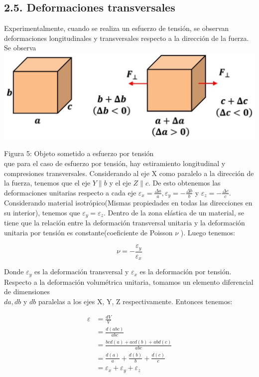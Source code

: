 \documentclass[10pt]{article}
\begin{document}
\subsection*{2.5. Deformaciones transversales}
Experimentalmente, cuando se realiza un esfuerzo de tensión, se observan deformaciones longitudinales y transversales respecto a la dirección de la fuerza. Se observa\\
\includegraphics[max width=\textwidth, center]{2025_04_28_a9941da8947ada55c6c9g-06}

Figura 5: Objeto sometido a esfuerzo por tensión\\
que para el caso de esfuerzo por tensión, hay estiramiento longitudinal y compresiones transversales. Considerando al eje X como paralelo a la dirección de la fuerza, tenemos que el eje $Y \| b$ y el eje $Z \| c$. De esto obtenemos las deformaciones unitarias respecto a cada eje $\varepsilon_{x}=\frac{\Delta a}{a}, \varepsilon_{y}=-\frac{\Delta b}{b}$ y $\varepsilon_{z}=-\frac{\Delta c}{c}$. Considerando material isotrópico(Mismas propiedades en todas las direcciones en su interior), tenemos que $\varepsilon_{y}=\varepsilon_{z}$. Dentro de la zona elástica de un material, se tiene que la relación entre la deformación transversal unitaria y la deformación unitaria por tensión es constante(coeficiente de Poisson $\nu$ ). Luego tenemos:


\begin{equation*}
\nu=-\frac{\varepsilon_{y}}{\varepsilon_{x}} \tag{4}
\end{equation*}


Donde $\varepsilon_{y}$ es la deformación transversal y $\varepsilon_{x}$ es la deformación por tensión. Respecto a la deformación volumétrica unitaria, tomamos un elemento diferencial de dimensiones\\
$d a, d b$ y $d b$ paralelas a los ejes X, Y, Z respectivamente. Entonces tenemos:

$$
\begin{aligned}
\varepsilon & =\frac{d V}{V} \\
& =\frac{d(a b c)}{a b c} \\
& =\frac{b c d(a)+a c d(b)+a b d(c)}{a b c} \\
& =\frac{d(a)}{a}+\frac{d(b)}{b}+\frac{d(c)}{c} \\
& =\varepsilon_{x}+\varepsilon_{y}+\varepsilon_{z}
\end{aligned}
$$
\end{document}
